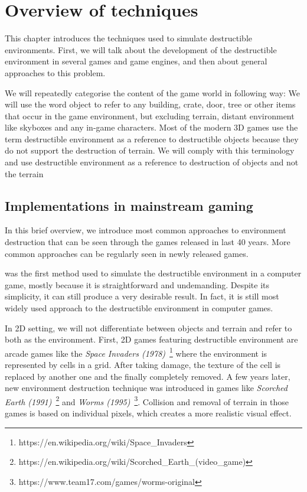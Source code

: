 \chapter{Overview of techniques}
This chapter introduces the techniques used to simulate destructible environments. First, we will talk about the development of the destructible environment in several games and game engines, and then about general approaches to this problem.

We will repeatedly categorise the content of the game world in following way: We will use the word object to refer to any building, crate, door, tree or other items that occur in the game environment, but excluding terrain, distant environment like skyboxes and any in-game characters. Most of the modern 3D games use the term destructible environment as a reference to destructible objects because they do not support the destruction of terrain. We will comply with this terminology and use destructible environment as a reference to destruction of objects and not the terrain

\section{Implementations in mainstream gaming}

In this brief overview, we introduce most common approaches to environment destruction that can be seen through the games released in last 40 years. More common approaches can be regularly seen in newly released games. 

 was the first method used to simulate the destructible environment in a computer game, mostly because it is straightforward and undemanding. Despite its simplicity, it can still produce a very desirable result. In fact, it is still most widely used approach to the destructible environment in computer games.

In 2D setting, we will not differentiate between objects and terrain and refer to both as the environment.
First, 2D games featuring destructible environment are arcade games like the \emph{Space Invaders (1978)}~\footnote{https://en.wikipedia.org/wiki/Space\_Invaders} where the environment is represented by cells in a grid. After taking damage, the texture of the cell is replaced by another one and the finally completely removed. A few years later, new environment destruction technique was introduced in games like \emph{Scorched Earth (1991)}~\footnote{https://en.wikipedia.org/wiki/Scorched\_Earth\_(video\_game)} and \emph{Worms (1995)}~\footnote{https://www.team17.com/games/worms-original}. Collision and removal of terrain in those games is based on individual pixels, which creates a more realistic visual effect.

